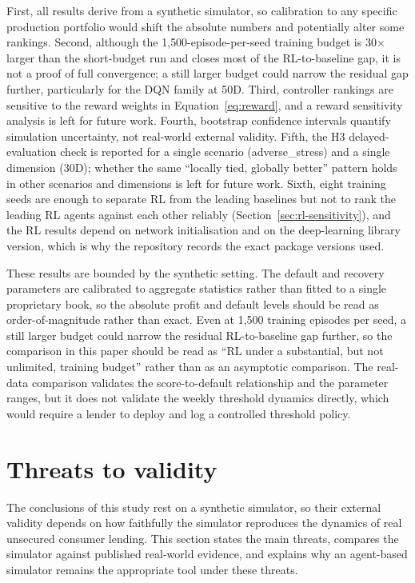 \documentclass[preprint,review,authoryear,12pt]{elsarticle}
\begin{document}
First, all results derive from a synthetic simulator, so calibration to any specific
production portfolio would shift the absolute numbers and potentially alter some
rankings. Second, although the 1{,}500-episode-per-seed training budget is 30$\times$
larger than the short-budget run and closes most of the RL-to-baseline gap, it is not a
proof of full convergence; a still larger budget could narrow the residual gap further,
particularly for the DQN family at 50D. Third, controller rankings are sensitive to the
reward weights in Equation~\eqref{eq:reward}, and a reward sensitivity analysis is left
for future work. Fourth, bootstrap confidence intervals quantify simulation uncertainty,
not real-world external validity. Fifth, the H3 delayed-evaluation check is reported for
a single scenario (adverse\_stress) and a single dimension (30D); whether the same
``locally tied, globally better'' pattern holds in other scenarios and dimensions is left
for future work. Sixth, eight training seeds are enough to separate RL from the leading
baselines but not to rank the leading RL agents against each other reliably
(Section~\ref{sec:rl-sensitivity}), and the RL results depend on network initialisation
and on the deep-learning library version, which is why the repository records the exact
package versions used.

These results are bounded by the synthetic setting. The default and recovery parameters are calibrated to aggregate statistics rather than fitted to a single proprietary book, so the absolute profit and default levels should be read as order-of-magnitude rather than exact. Even at 1{,}500 training episodes per seed, a still larger budget could narrow the residual RL-to-baseline gap further, so the comparison in this paper should be read as ``RL under a substantial, but not unlimited, training budget'' rather than as an asymptotic comparison. The real-data comparison validates the score-to-default relationship and the parameter ranges, but it does not validate the weekly threshold dynamics directly, which would require a lender to deploy and log a controlled threshold policy.

\section{Threats to validity}
\label{sec:threats}
The conclusions of this study rest on a synthetic simulator, so their external validity depends on how faithfully the simulator reproduces the dynamics of real unsecured consumer lending. This section states the main threats, compares the simulator against published real-world evidence, and explains why an agent-based simulator remains the appropriate tool under these threats.
\end{document}
